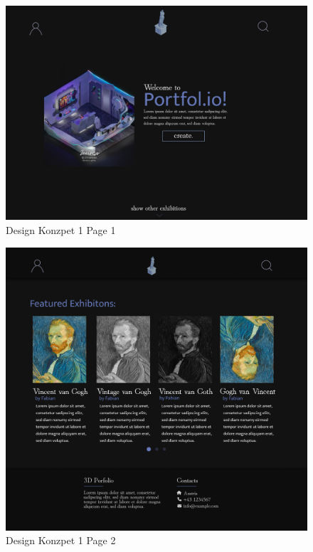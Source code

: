 \begin{figure}
    \centering
    \includegraphics[scale=0.3]{pics/DesignKonzept1_1.png}
    \caption{Design Konzpet 1 Page 1}
    \label{fig:impl:knuth}
\end{figure}

\begin{figure}
    \centering
    \includegraphics[scale=0.3]{pics/DesignKonzept1_2.png}
    \caption{Design Konzpet 1 Page 2}
    \label{fig:impl:knuth}
\end{figure}

